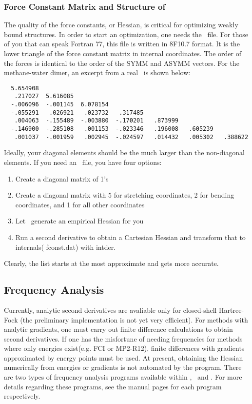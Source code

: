 \subsubsection{Force Constant Matrix and Structure of \fconstdat}
The quality of the force constants, or Hessian, is critical for
optimizing weakly bound structures. In order to start an optimization,
one needs the \fconstdat\ file. For those of you that can speak
Fortran 77, this file is written in 8F10.7 format. It is the lower
triangle of the force constant matrix in internal coordinates. The
order of the forces is identical to the order of the SYMM and ASYMM
vectors.  For the methane-water dimer, an excerpt from a real
\fconstdat\ is shown below: \begin{verbatim}
  5.654908
   .217027  5.616085
  -.006096  -.001145  6.078154
  -.055291   .026921   .023732   .317485
   .004063  -.155489  -.003880  -.170201   .873999
  -.146900  -.285108   .001153  -.023346   .196008   .605239
   .001037  -.001959   .002945  -.024597   .014432   .005302   .388622
\end{verbatim}
Ideally, your diagonal elements should be the much larger than the
non-diagonal elements. If you need an \fconstdat\ file, you have four
options:
\begin{enumerate}
\item Create a diagonal matrix of 1's 
\item Create a diagonal matrix with 5 for stretching coordinates,
2 for bending coordinates, and 1 for all other coordinates 
\item Let \PSIoptking\ generate an empirical Hessian for you
\item Run a second derivative to obtain a Cartesian Hessian
and transform that to internals( fconst.dat) with intder. 
\end{enumerate}
Clearly, the list starts at the most
approximate and gets more accurate. 

\subsection{Frequency Analysis}
Currently, analytic second derivatives are avaliable only for closed-shell
Hartree-Fock (the preliminary implementation is not yet very efficient).  
For methods with analytic gradients, one must carry out finite difference 
calculations to obtain second derivatives. If one has the
misfortune of needing frequencies for methods where only energies
exist(e.g. FCI or MP2-R12), finite differences with gradients
approximated by energy points must be used. At present, obtaining the
Hessian numerically from energies or gradients is not automated by the
program.  There are two types of frequency analysis programs available
within \PSIthree, \PSInormco\ and \PSIintder.  For more details
regarding these programs, see the manual pages for each program
respectively.

